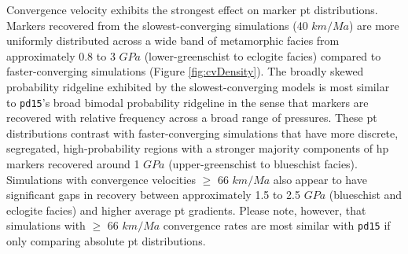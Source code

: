 Convergence velocity exhibits the strongest effect on marker \gls{pt} distributions. Markers recovered from the slowest-converging simulations (40 \(km/Ma\)) are more uniformly distributed across a wide band of metamorphic facies from approximately 0.8 to 3 \(GPa\) (lower-greenschist to eclogite facies) compared to faster-converging simulations (Figure \ref{fig:cvDensity}). The broadly skewed probability ridgeline exhibited by the slowest-converging models is most similar to \texttt{pd15}'s broad bimodal probability ridgeline in the sense that markers are recovered with relative frequency across a broad range of pressures. These \gls{pt} distributions contrast with faster-converging simulations that have more discrete, segregated, high-probability regions with a stronger majority components of \gls{hp} markers recovered around 1 \(GPa\) (upper-greenschist to blueschist facies). Simulations with convergence velocities \(\geq\) 66 \(km/Ma\) also appear to have significant gaps in recovery between approximately 1.5 to 2.5 \(GPa\) (blueschist and eclogite facies) and higher average \gls{pt} gradients. Please note, however, that simulations with \(\geq\) 66 \(km/Ma\) convergence rates are most similar with \texttt{pd15} if only comparing absolute \gls{pt} distributions.



